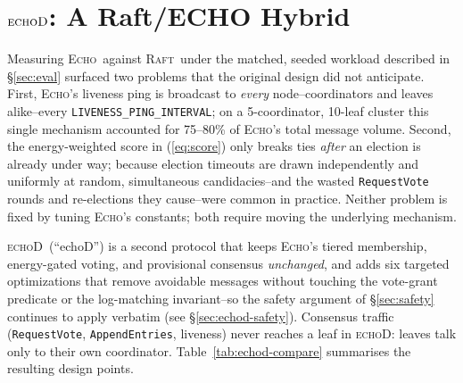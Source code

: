 \documentclass[conference]{IEEEtran}
\newcommand{\echoproto}{\textsc{Echo}\xspace}
\newcommand{\raftproto}{\textsc{Raft}\xspace}
\newcommand{\echodproto}{\textsc{echoD}\xspace}
\begin{document}
\section{\texorpdfstring{$\echodproto$}{echoD}: A Raft/ECHO Hybrid}\label{sec:echod}

Measuring \echoproto\ against \raftproto\ under the matched, seeded
workload described in \S\ref{sec:eval} surfaced two problems that the
original design did not anticipate. First, \echoproto's liveness ping is
broadcast to \emph{every} node--coordinators and leaves alike--every
\texttt{LIVENESS\_PING\_INTERVAL}; on a 5-coordinator, 10-leaf cluster
this single mechanism accounted for 75--80\% of \echoproto's total
message volume. Second, the energy-weighted score in
(\ref{eq:score}) only breaks ties \emph{after} an election is already
under way; because election timeouts are drawn independently and
uniformly at random, simultaneous candidacies--and the wasted
\texttt{RequestVote} rounds and re-elections they cause--were common in
practice. Neither problem is fixed by tuning \echoproto's constants;
both require moving the underlying mechanism.

\echodproto\ (``echoD'') is a second protocol that keeps \echoproto's
tiered membership, energy-gated voting, and provisional consensus
\emph{unchanged}, and adds six targeted optimizations that remove
avoidable messages without touching the vote-grant predicate or the
log-matching invariant--so the safety argument of \S\ref{sec:safety}
continues to apply verbatim (see \S\ref{sec:echod-safety}). Consensus
traffic (\texttt{RequestVote}, \texttt{AppendEntries}, liveness) never
reaches a leaf in \echodproto: leaves talk only to their own
coordinator. Table~\ref{tab:echod-compare} summarises the resulting
design points.
\end{document}
